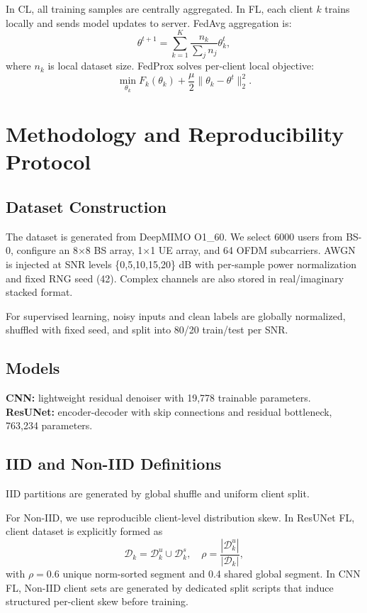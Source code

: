 \documentclass[onecolumn]{IEEEtran}
\begin{document}
In CL, all training samples are centrally aggregated. In FL, each client $k$ trains locally and sends model updates to server. FedAvg aggregation is:
\begin{equation}
\theta^{t+1} = \sum_{k=1}^{K} \frac{n_k}{\sum_j n_j}\theta_k^t,
\end{equation}
where $n_k$ is local dataset size. FedProx solves per-client local objective:
\begin{equation}
\min_{\theta_k} F_k(\theta_k) + \frac{\mu}{2}\|\theta_k-\theta^t\|_2^2.
\end{equation}

\section{Methodology and Reproducibility Protocol}
\subsection{Dataset Construction}
The dataset is generated from DeepMIMO O1\_60. We select 6000 users from BS-0, configure an 8$\times$8 BS array, 1$\times$1 UE array, and 64 OFDM subcarriers. AWGN is injected at SNR levels \{0,5,10,15,20\} dB with per-sample power normalization and fixed RNG seed (42). Complex channels are also stored in real/imaginary stacked format.

For supervised learning, noisy inputs and clean labels are globally normalized, shuffled with fixed seed, and split into 80/20 train/test per SNR.

\subsection{Models}
\textbf{CNN:} lightweight residual denoiser with 19,778 trainable parameters. 
\textbf{ResUNet:} encoder-decoder with skip connections and residual bottleneck, 763,234 parameters.

\subsection{IID and Non-IID Definitions}
IID partitions are generated by global shuffle and uniform client split.

For Non-IID, we use reproducible client-level distribution skew. In ResUNet FL, client dataset is explicitly formed as
\begin{equation}
\mathcal{D}_k=\mathcal{D}_k^u \cup \mathcal{D}_k^s,\quad \rho=\frac{|\mathcal{D}_k^u|}{|\mathcal{D}_k|},
\end{equation}
with $\rho=0.6$ unique norm-sorted segment and 0.4 shared global segment. In CNN FL, Non-IID client sets are generated by dedicated split scripts that induce structured per-client skew before training.
\end{document}
